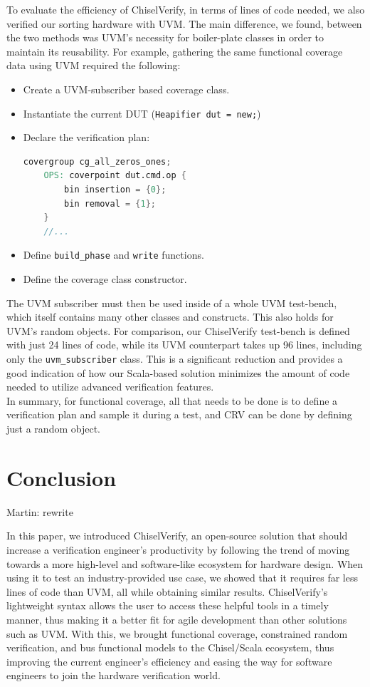 \documentclass[conference]{IEEEtran}
\newcommand{\martin}[1]{{\color{blue} Martin: #1}}
\begin{document}
To evaluate the efficiency of ChiselVerify, in terms of lines of code needed, we also verified our sorting hardware with UVM.
The main difference, we found, between the two methods was UVM's necessity for boiler-plate classes in order to maintain its reusability.
For example, gathering the same functional coverage data using UVM required the following: 
\begin{itemize}
    \item Create a UVM-subscriber based coverage class.
    \item Instantiate the current DUT (\texttt{Heapifier dut = new;})
    \item Declare the verification plan: 
    \begin{lstlisting}[language=verilog]
	covergroup cg_all_zeros_ones;
	OPS: coverpoint dut.cmd.op {
		bin insertion = {0};
		bin removal = {1};
	}
	//...
    \end{lstlisting}
    \item Define \texttt{build\_phase} and \texttt{write} functions.
    \item Define the coverage class constructor.
\end{itemize}  
The UVM subscriber must then be used inside of a whole UVM test-bench, which itself contains many other classes and constructs.
This also holds for UVM's random objects.
For comparison, our ChiselVerify test-bench is defined with just 24 lines of code,
while its UVM counterpart takes up 96 lines, including only the \texttt{uvm\_subscriber} class.
This is a significant reduction and provides a good indication of how our Scala-based solution minimizes the amount of code needed to utilize advanced verification features. \\
In summary, for functional coverage, all that needs to be done is to define a verification plan and sample it during a test, and
CRV can be done by defining just a random object. 

\section{Conclusion}

\martin{rewrite}

In this paper, we introduced ChiselVerify, an open-source solution that should increase a verification engineer's productivity by following the trend of moving towards a more high-level and software-like ecosystem for hardware design. 
When using it to test an industry-provided use case, we showed that it requires far less lines of code than UVM, all while obtaining similar results.
ChiselVerify's lightweight syntax allows the user to access these helpful tools in a timely manner, thus making it a better fit for agile development than other solutions such as UVM.
With this, we brought functional coverage, constrained random verification, and bus functional models to the Chisel/Scala ecosystem, thus improving the current engineer's efficiency and easing the way for software engineers to join the hardware verification world.
\end{document}
